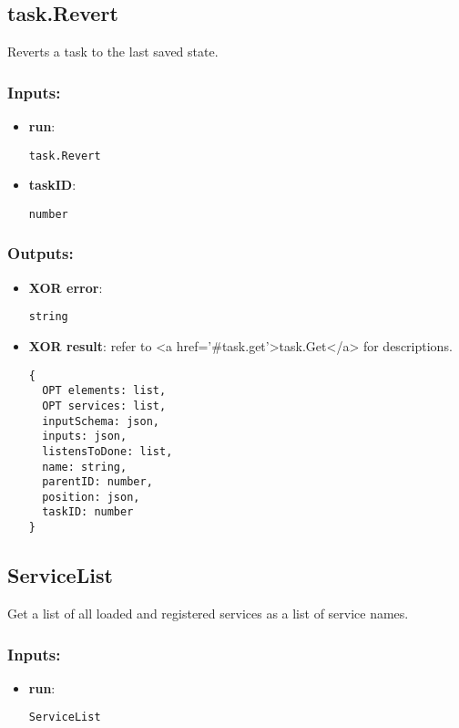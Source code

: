 \subsection{task.Revert}
\label{ch:builtinservices:task.Revert}
Reverts a task to the last saved state.
\subsubsection*{Inputs:}
\begin{itemize}
    \item \textbf{run}: 
\begin{lstlisting}
task.Revert
\end{lstlisting}
    \item \textbf{taskID}: 
\begin{lstlisting}
number
\end{lstlisting}
  \end{itemize}

\subsubsection*{Outputs:}
\begin{itemize}
    \item \textbf{XOR error}: 
\begin{lstlisting}
string
\end{lstlisting}
    \item \textbf{XOR result}: refer to <a href='\#task.get'>task.Get</a> for descriptions.
\begin{lstlisting}
{
  OPT elements: list, 
  OPT services: list, 
  inputSchema: json, 
  inputs: json, 
  listensToDone: list, 
  name: string, 
  parentID: number, 
  position: json, 
  taskID: number
}
\end{lstlisting}
  \end{itemize}

\subsection{ServiceList}
\label{ch:builtinservices:ServiceList}
Get a list of all loaded and registered services as a list of service names.
\subsubsection*{Inputs:}
\begin{itemize}
    \item \textbf{run}: 
\begin{lstlisting}
ServiceList
\end{lstlisting}
  \end{itemize}

